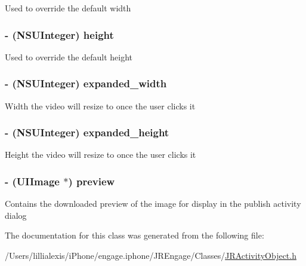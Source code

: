 \label{interface_j_r_flash_media_object_aaeb77e697438b7aa6e44f52bea0ed9c2}
Used to override the default width \hypertarget{interface_j_r_flash_media_object_a0689e19fdf6cb9d3911878a95d6ebcc9}{
\subsubsection[{height}]{\setlength{\rightskip}{0pt plus 5cm}-\/ (NSUInteger) height}}
\label{interface_j_r_flash_media_object_a0689e19fdf6cb9d3911878a95d6ebcc9}
Used to override the default height \hypertarget{interface_j_r_flash_media_object_a9c380d0410afa60d99442f4ab84b517c}{
\subsubsection[{expanded\_\-width}]{\setlength{\rightskip}{0pt plus 5cm}-\/ (NSUInteger) expanded\_\-width}}
\label{interface_j_r_flash_media_object_a9c380d0410afa60d99442f4ab84b517c}
Width the video will resize to once the user clicks it \hypertarget{interface_j_r_flash_media_object_ae390a89405d768f2fcc63c24a8271503}{
\subsubsection[{expanded\_\-height}]{\setlength{\rightskip}{0pt plus 5cm}-\/ (NSUInteger) expanded\_\-height}}
\label{interface_j_r_flash_media_object_ae390a89405d768f2fcc63c24a8271503}
Height the video will resize to once the user clicks it \hypertarget{interface_j_r_flash_media_object_ac2969bd0da7e91ffa99758dcccb26efb}{
\subsubsection[{preview}]{\setlength{\rightskip}{0pt plus 5cm}-\/ (UIImage $\ast$) preview}}
\label{interface_j_r_flash_media_object_ac2969bd0da7e91ffa99758dcccb26efb}
Contains the downloaded preview of the image for display in the publish activity dialog 

The documentation for this class was generated from the following file:\begin{DoxyCompactItemize}
\item 
/Users/lillialexis/iPhone/engage.iphone/JREngage/Classes/\hyperlink{_j_r_activity_object_8h}{JRActivityObject.h}\end{DoxyCompactItemize}
